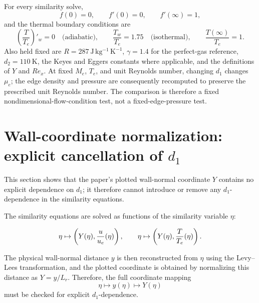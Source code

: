 For every similarity solve,
\begin{equation}
  f(0)=0,\qquad f'(0)=0,\qquad f'(\infty)=1,
\end{equation}
and the thermal boundary conditions are
\begin{equation}
  \left(\frac{T}{T_e}\right)'_{\!w}=0
  \quad\text{(adiabatic)},
  \qquad
  \frac{T_w}{T_e}=1.75
  \quad\text{(isothermal)},
  \qquad
  \frac{T(\infty)}{T_e}=1.
\end{equation}
Also held fixed are \(R=287~\mathrm{J\,kg^{-1}\,K^{-1}}\), \(\gamma=1.4\) for the perfect-gas reference, \(d_2=110~\mathrm{K}\), the Keyes and Eggers constants where applicable, and the definitions of \(Y\) and \(Re_x\). At fixed \(M_e\), \(T_e\), and unit Reynolds number, changing \(d_1\) changes \(\mu_e\); the edge density and pressure are consequently recomputed to preserve the prescribed unit Reynolds number. The comparison is therefore a fixed nondimensional-flow-condition test, not a fixed-edge-pressure test.

\section{Wall-coordinate normalization: explicit cancellation of \texorpdfstring{\(d_1\)}{d1}}
\label{app:ma:sec:wall_coordinate}

This section shows that the \maAppName{} paper's plotted wall-normal coordinate \(Y\) contains no explicit dependence on \(d_1\); it therefore cannot introduce or remove any \(d_1\)-dependence in the similarity equations.

The similarity equations are solved as functions of the similarity variable \(\eta\):

\[
  \eta\mapsto
  \left(Y(\eta),\frac{u}{u_e}(\eta)\right),
  \qquad
  \eta\mapsto
  \left(Y(\eta),\frac{T}{T_e}(\eta)\right).
\]

The physical wall-normal distance \(y\) is then reconstructed from \(\eta\) using the Levy--Lees transformation, and the plotted coordinate is obtained by normalizing this distance as \(Y=y/L_r\). Therefore, the full coordinate mapping
\[
  \eta \mapsto y(\eta) \mapsto Y(\eta)
\]
must be checked for explicit \(d_1\)-dependence.

